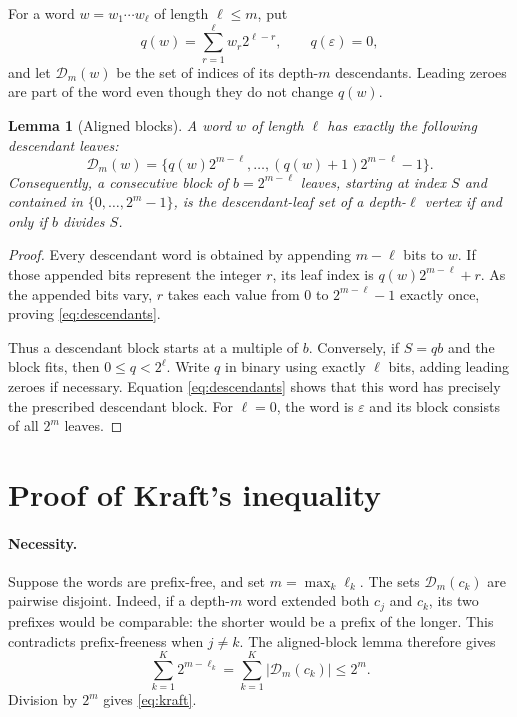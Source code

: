 \documentclass[11pt]{article}
\newtheorem{lemma}{Lemma}
\newcommand{\Desc}{\mathcal D}
\begin{document}
For a word $w=w_1\cdots w_\ell$ of length $\ell\leq m$, put
\[
    q(w)=\sum_{r=1}^{\ell}w_r2^{\ell-r},
    \qquad q(\varepsilon)=0,
\]
and let $\Desc_m(w)$ be the set of indices of its depth-$m$ descendants.
Leading zeroes are part of the word even though they do not change $q(w)$.

\begin{lemma}[Aligned blocks]\label{lem:aligned}
A word $w$ of length $\ell$ has exactly the following descendant leaves:
\begin{equation}\label{eq:descendants}
 \Desc_m(w)=
 \bigl\{q(w)2^{m-\ell},\ldots,(q(w)+1)2^{m-\ell}-1\bigr\}.
\end{equation}
Consequently, a consecutive block of $b=2^{m-\ell}$ leaves, starting at index
$S$ and contained in $\{0,\ldots,2^m-1\}$, is the descendant-leaf set of a
depth-$\ell$ vertex if and only if $b$ divides $S$.
\end{lemma}

\begin{proof}
Every descendant word is obtained by appending $m-\ell$ bits to $w$.
If those appended bits represent the integer $r$, its leaf index is
$q(w)2^{m-\ell}+r$. As the appended bits vary, $r$ takes each value from
$0$ to $2^{m-\ell}-1$ exactly once, proving \eqref{eq:descendants}.

Thus a descendant block starts at a multiple of $b$. Conversely, if
$S=qb$ and the block fits, then $0\leq q<2^\ell$. Write $q$ in binary using
exactly $\ell$ bits, adding leading zeroes if necessary. Equation
\eqref{eq:descendants} shows that this word has precisely the prescribed
descendant block. For $\ell=0$, the word is $\varepsilon$ and its block
consists of all $2^m$ leaves.
\end{proof}

\section*{Proof of Kraft's inequality}

\paragraph{Necessity.}
Suppose the words are prefix-free, and set $m=\max_k\ell_k$.
The sets $\Desc_m(c_k)$ are pairwise disjoint. Indeed, if a depth-$m$ word
extended both $c_j$ and $c_k$, its two prefixes would be comparable:
the shorter would be a prefix of the longer. This contradicts prefix-freeness
when $j\ne k$.
The aligned-block lemma therefore gives
\[
 \sum_{k=1}^K 2^{m-\ell_k}
   =\sum_{k=1}^K|\Desc_m(c_k)|
   \leq 2^m.
\]
Division by $2^m$ gives \eqref{eq:kraft}.
\end{document}
